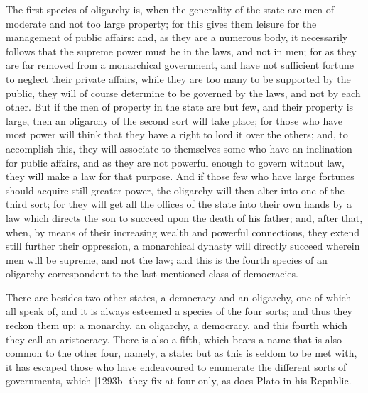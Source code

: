 The first species of oligarchy is, when the generality of the state are
men of moderate and not too large property; for this gives them leisure
for the management of public affairs: and, as they are a numerous body, it
necessarily follows that the supreme power must be in the laws, and not in
men; for as they are far removed from a monarchical government, and have
not sufficient fortune to neglect their private affairs, while they are
too many to be supported by the public, they will of course determine to
be governed by the laws, and not by each other. But if the men of property
in the state are but few, and their property is large, then an oligarchy
of the second sort will take place; for those who have most power will
think that they have a right to lord it over the others; and, to
accomplish this, they will associate to themselves some who have an
inclination for public affairs, and as they are not powerful enough to
govern without law, they will make a law for that purpose. And if those
few who have large fortunes should acquire still greater power, the
oligarchy will then alter into one of the third sort; for they will get
all the offices of the state into their own hands by a law which directs
the son to succeed upon the death of his father; and, after that, when, by
means of their increasing wealth and powerful connections, they extend
still further their oppression, a monarchical dynasty will directly
succeed wherein men will be supreme, and not the law; and this is the
fourth species of an oligarchy correspondent to the last-mentioned class
of democracies.


There are besides two other states, a democracy and an oligarchy, one of
which all speak of, and it is always esteemed a species of the four sorts;
and thus they reckon them up; a monarchy, an oligarchy, a democracy, and
this fourth which they call an aristocracy. There is also a fifth, which
bears a name that is also common to the other four, namely, a state: but
as this is seldom to be met with, it has escaped those who have
endeavoured to enumerate the different sorts of governments, which [1293b]
they fix at four only, as does Plato in his Republic.

